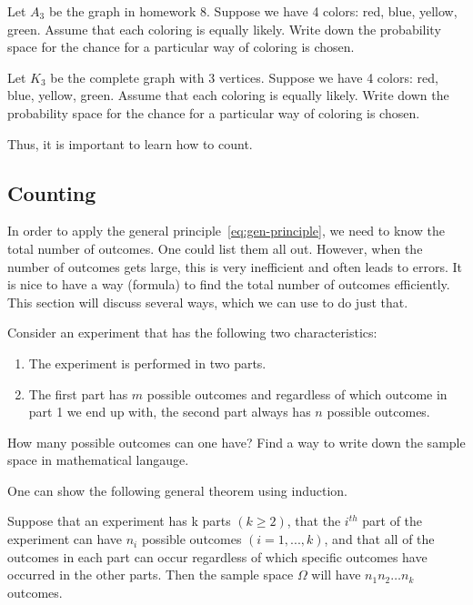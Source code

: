 \begin{example}
    Let $A_3$ be the graph in homework 8.
    Suppose we have 4 colors: red, blue, yellow, green.
    Assume that each coloring is equally likely. Write down 
    the probability space for the chance for a particular way of coloring is chosen.
\end{example}

\begin{example}
    Let $K_3$ be the complete graph with 3 vertices.
    Suppose we have 4 colors: red, blue, yellow, green.
    Assume that each coloring is equally likely. Write down 
    the probability space for the chance for a particular way of coloring is chosen.
\end{example}
Thus, it is important to learn how to count.

\subsection{Counting}
In order to apply the general principle~\ref{eq:gen-principle}, we need to know
the total number of outcomes.
One could list them all out. However, when the number of outcomes gets large,
this is very inefficient and often leads to errors.
It is nice to have a way (formula) to find the total number of outcomes efficiently.
This section will discuss several ways, which we can use to do just that.


\begin{example}
   Consider an experiment that has the following two characteristics: 
    \begin{enumerate}
        \item The experiment is performed in two parts.
        \item The first part has $m$ possible outcomes and regardless
            of which outcome in part 1 we end up with, the second part
            always has $n$ possible outcomes.
    \end{enumerate}
    How many possible outcomes can one have?
    Find a way to write down the sample space in mathematical langauge.
\end{example}

One can show the following general theorem using induction.
\begin{theorem}
    Suppose that an experiment has k parts $(k\geq 2)$, that the $i^{th}$ part of the experiment can have 
    $n_i$ possible outcomes $(i = 1,..., k)$, and that all of the outcomes in 
    each part can occur regardless of which specific outcomes have occurred in the other parts.
    Then the sample space $\Omega$ will have $n_1n_2\dots n_k$ outcomes.
\end{theorem}

